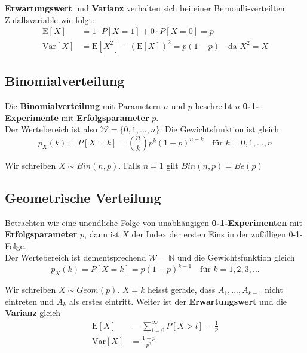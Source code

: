 \documentclass[11pt]{article}
\newcommand{\E}{\text{E}}
\newcommand{\Var}{\text{Var}}
\begin{document}
\textbf{Erwartungswert} und \textbf{Varianz} verhalten sich bei einer Bernoulli-verteilten Zufallsvariable wie folgt:
\begin{equation*}
\begin{split}
	\E[X] & = 1 \cdot P[X = 1] + 0 \cdot P[X = 0] = p \\
	\Var[X] & = \E[X^2] - (\E[X])^2 = p(1-p) \quad \text{da } X^2 = X
\end{split}
\end{equation*}

\subsection{Binomialverteilung}

Die \textbf{Binomialverteilung} mit Parametern $n$ und $p$ beschreibt $n$ \textbf{0-1-Experimente} mit \textbf{Erfolgsparameter} $p$. \\
Der Wertebereich ist also $\mathcal{W} = \{0, 1, ..., n\}$. Die Gewichtsfunktion ist gleich
\begin{equation*}
	p_X(k) = P[X = k] = \binom{n}{k}p^k(1-p)^{n-k} \quad\text{für } k = 0, 1, ..., n
\end{equation*}

Wir schreiben $X \sim Bin(n,p)$. Falls $n = 1$ gilt $Bin(n,p) = Be(p)$

\subsection{Geometrische Verteilung}

Betrachten wir eine unendliche Folge von unabhängigen \textbf{0-1-Experimenten} mit \textbf{Erfolgsparameter} $p$, dann ist $X$ der Index der ersten Eins in der zufälligen 0-1-Folge. \\
Der Wertebereich ist dementsprechend $\mathcal{W} = \mathbb{N}$ und die Gewichtsfunktion gleich
\begin{equation*}
	p_X(k) = P[X = k] = p(1-p)^{k-1} \quad\text{für } k = 1, 2, 3,...
\end{equation*}

Wir schreiben $X \sim Geom(p)$. $X = k$ heisst gerade, dass $A_1,..., A_{k-1}$ nicht eintreten und $A_k$ als erstes eintritt. Weiter ist der \textbf{Erwartungswert} und die \textbf{Varianz} gleich
\begin{equation*}
\begin{split}
	\E[X] & = \sum_{l=0}^\infty P[X > l] = \frac{1}{p} \\
	\Var[X] & = \frac{1-p}{p^2}
\end{split}
\end{equation*}
\end{document}
